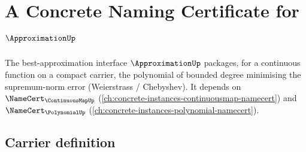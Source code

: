 \chapter{A Concrete Naming Certificate for $\ApproximationUp$}
\label{ch:concrete-instances-approximation-namecert}

The best-approximation interface $\ApproximationUp$ packages, for a continuous function on a compact carrier, the polynomial of bounded degree minimising the supremum-norm error (Weierstrass / Chebyshev). It depends on $\NameCert_{\ContinuousMapUp}$ (\autoref{ch:concrete-instances-continuousmap-namecert}) and $\NameCert_{\PolynomialUp}$ (\autoref{ch:concrete-instances-polynomial-namecert}).

\section{Carrier definition}
\label{sec:approximation-carrier}

